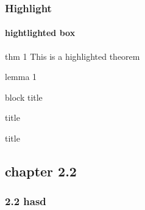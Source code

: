 \documentclass[12pt]{beamer}
\begin{document}
\begin{frame}
\frametitle{Highlight}
\framesubtitle{hightlighted box}

\begin{block}{thm 1}
		This is a highlighted theorem
\end{block}


\begin{block}{lemma 1}
\end{block}



\begin{block}{ block title}
\end{block}

\begin{alertblock}{  title}
\end{alertblock}
\begin{example}{  title}
\end{example}



\end{frame}



\subsection{chapter 2.2}

\begin{frame}
\frametitle{2.2 hasd}


\end{frame}
\end{document}
